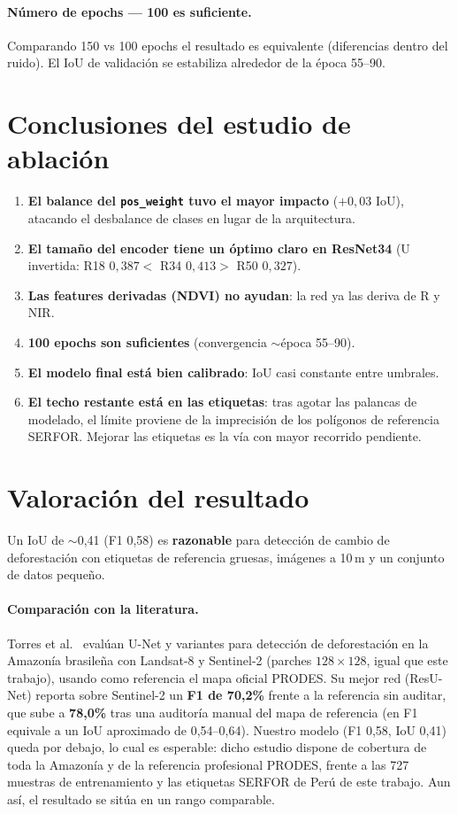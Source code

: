 \documentclass[onecolumn,conference]{IEEEtran}
\begin{document}
\paragraph{Número de epochs --- 100 es suficiente.}
Comparando 150 vs 100 epochs el resultado es equivalente (diferencias dentro del ruido). El
IoU de validación se estabiliza alrededor de la época 55--90.

\section{Conclusiones del estudio de ablación}

\begin{enumerate}
  \item \textbf{El balance del \texttt{pos\_weight} tuvo el mayor impacto} ($+0{,}03$ IoU),
        atacando el desbalance de clases en lugar de la arquitectura.
  \item \textbf{El tamaño del encoder tiene un óptimo claro en ResNet34} (U invertida:
        R18 $0{,}387 <$ R34 $0{,}413 >$ R50 $0{,}327$).
  \item \textbf{Las features derivadas (NDVI) no ayudan}: la red ya las deriva de R y NIR.
  \item \textbf{100 epochs son suficientes} (convergencia $\sim$época 55--90).
  \item \textbf{El modelo final está bien calibrado}: IoU casi constante entre umbrales.
  \item \textbf{El techo restante está en las etiquetas}: tras agotar las palancas de
        modelado, el límite proviene de la imprecisión de los polígonos de referencia
        SERFOR. Mejorar las etiquetas es la vía con mayor recorrido pendiente.
\end{enumerate}

\section{Valoración del resultado}

Un IoU de $\sim$0,41 (F1 0,58) es \textbf{razonable} para detección de cambio de
deforestación con etiquetas de referencia gruesas, imágenes a 10\,m y un conjunto de datos
pequeño.

\paragraph{Comparación con la literatura.}
Torres et al.~\cite{torres2021deforestation} evalúan U-Net y variantes para detección de
deforestación en la Amazonía brasileña con Landsat-8 y Sentinel-2 (parches $128\times128$,
igual que este trabajo), usando como referencia el mapa oficial PRODES. Su mejor red
(ResU-Net) reporta sobre Sentinel-2 un \textbf{F1 de 70,2\%} frente a la referencia sin
auditar, que sube a \textbf{78,0\%} tras una auditoría manual del mapa de referencia (en
F1 equivale a un IoU aproximado de 0,54--0,64). Nuestro modelo (F1 0,58, IoU 0,41) queda
por debajo, lo cual es esperable: dicho estudio dispone de cobertura de toda la Amazonía y
de la referencia profesional PRODES, frente a las 727 muestras de entrenamiento y las
etiquetas SERFOR de Perú de este trabajo. Aun así, el resultado se sitúa en un rango
comparable.
\end{document}
